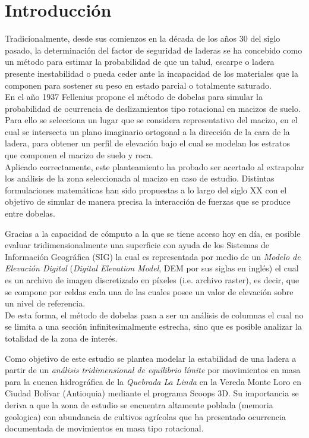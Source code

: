 \chapter{Introducci\'{o}n}
Tradicionalmente, desde sus comienzos en la d\'ecada de los a\~nos 30 del siglo pasado, la determinaci\'on del factor de seguridad de laderas se ha concebido como un m\'etodo para estimar la probabilidad de que un talud, escarpe o ladera presente inestabilidad o pueda ceder ante la incapacidad de los materiales que la componen para sostener su peso en estado parcial o totalmente saturado.\\

En el a\~{n}o 1937 Fellenius propone el m\'etodo de dobelas para simular la probabilidad de ocurrencia de deslizamientos tipo rotacional en macizos de suelo. Para ello se selecciona un lugar que se considera representativo del macizo, en el cual se intersecta un plano imaginario ortogonal a la direcci\'on de la cara de la ladera, para obtener un perfil de elevaci\'on bajo el cual se modelan los estratos que componen el macizo de suelo y roca.\\

Aplicado correctamente, este planteamiento ha probado ser acertado al extrapolar los an\'alisis de la zona seleccionada al macizo en caso de estudio. Distintas formulaciones matem\'aticas han sido propuestas a lo largo del siglo XX con el objetivo de simular de manera precisa la interacci\'on de fuerzas que se produce entre dobelas.

Gracias a la capacidad de c\'omputo a la que se tiene acceso hoy en d\'ia, es posible evaluar tridimensionalmente una superficie con ayuda de los Sistemas de Informaci\'on Geogr\'afica (SIG) la cual es representada por medio de un \emph{Modelo de Elevaci\'on Digital} (\textit{Digital Elevation Model}, DEM por sus siglas en ingl\'es) el cual es un archivo de imagen discretizado en p\'ixeles (i.e. archivo raster), es decir, que se compone por celdas cada una de las cuales posee un valor de elevaci\'on sobre un nivel de referencia.
\\
De esta forma, el m\'etodo de dobelas pasa a ser un an\'alisis de columnas el cual no se limita a una secci\'on infinitesimalmente estrecha, sino que es posible analizar la totalidad de la zona de inter\'es.\par

Como objetivo de este estudio se plantea modelar la estabilidad de una ladera a partir de un \emph{an\'alisis tridimensional de equilibrio l\'imite} por movimientos en masa para la cuenca hidrogr\'afica de la \emph{Quebrada La Linda} en la Vereda Monte Loro en Ciudad Bol\'ivar (Antioquia) mediante el programa Scoops 3D.
Su importancia se deriva a que la zona de estudio se encuentra altamente poblada (memoria geologica) con abundancia de cultivos agr\'icolas que ha presentado ocurrencia documentada de movimientos en masa tipo rotacional.\\

